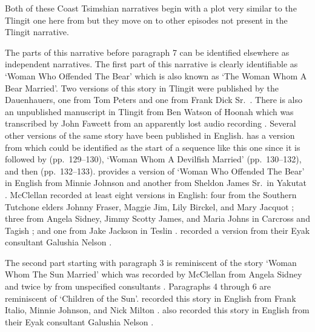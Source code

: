 Both of these Coast Tsimshian narratives begin with a plot very similar to the Tlingit one here from  but they move on to other episodes not present in the Tlingit narrative.

The parts of this narrative before paragraph 7 can be identified elsewhere as independent narratives.
The first part of this narrative is clearly identifiable as  ‘Woman Who Offended The Bear’ which is also known as  ‘The Woman Whom A Bear Married’.
Two versions of this story in Tlingit were published by the Dauenhauers, one from  Tom Peters \parencite[166–193]{dauenhauer:1987} and one from  Frank Dick Sr.\ \parencite[194–217]{dauenhauer:1987}.
There is also an unpublished manuscript in Tlingit from  Ben Watson of Hoonah which was transcribed by  John Fawcett from an apparently lost audio recording \parencite{fawcett:1973a}.
Several other versions of the same story have been published in English.
\citeauthor{swanton:1909} has a version from  \parencite[126–129]{swanton:1909} which could be identified as the start of a sequence like this one since it is followed by  (pp.\ 129–130),  ‘Woman Whom A Devilfish Married’ (pp.\ 130–132), and then  (pp.\ 132–133).
\citeauthor{de-laguna:1972} provides a version of  ‘Woman Who Offended The Bear’ in English from  Minnie Johnson and another from  Sheldon James Sr.\ in Yakutat \parencite[880–883]{de-laguna:1972}.
McClellan recorded at least eight versions in English: four from the Southern Tutchone elders Johnny Fraser, Maggie Jim, Lily Birckel, and Mary Jacquot \parencite[39–41, 143–146, 163–167, 181–186]{mcclellan-cruikshank:2007a}; three from  Angela Sidney,  Jimmy Scotty James, and  Maria Johns in Carcross and Tagish \parencite[302–308, 435–437, 465–474]{mcclellan-cruikshank:2007b}; and one from  Jake Jackson in Teslin \parencite[498–512]{mcclellan-cruikshank:2007c}.
\citeauthor{birket-smith-de-laguna:1938} recorded a version from their Eyak consultant Galushia Nelson \parencite[277–279]{birket-smith-de-laguna:1938}.

The second part starting with paragraph 3 is reminiscent of the story  ‘Woman Whom The Sun Married’ which was recorded by McClellan from  Angela Sidney \parencite[288–289]{mcclellan-cruikshank:2007a} and twice by \citeauthor{olson:1967} from unspecified consultants \parencite[44, 67 col.\ 2 ¶3]{olson:1967}.
Paragraphs 4 through 6 are reminiscent of  ‘Children of the Sun’.
\citeauthor{de-laguna:1972} recorded this story in English from  Frank Italio,  Minnie Johnson, and  Nick Milton \parencite[873–875]{de-laguna:1972}.
\citeauthor{birket-smith-de-laguna:1938} also recorded this story in English from their Eyak consultant Galushia Nelson \parencite[294–300]{birket-smith-de-laguna:1938}.

